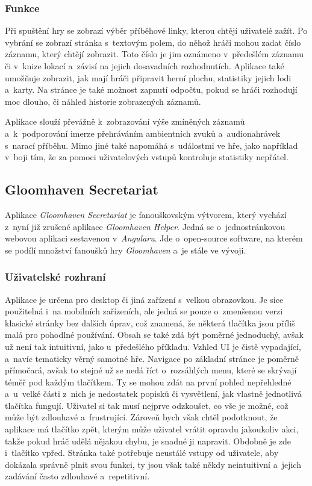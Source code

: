 \subsubsection*{Funkce}
Při spuštění hry se zobrazí výběr příběhové linky, kterou chtějí uživatelé zažít. Po vybrání se zobrazí stránka s~textovým polem, do něhož hráči mohou zadat číslo záznamu, který chtějí zobrazit. Toto číslo je jim oznámeno v~předešlém záznamu či v~knize lokací a~závisí na jejich dosavadních rozhodnutích. Aplikace také umožňuje zobrazit, jak mají hráči připravit herní plochu, statistiky jejich lodi a~karty. Na stránce je také možnost zapnutí odpočtu, pokud se hráči rozhodují moc dlouho, či náhled historie zobrazených záznamů.

Aplikace slouží převážně k~zobrazování výše zmíněných záznamů a~k~podporování imerze přehráváním ambientních zvuků a~audionahrávek s~narací příběhu. Mimo jiné také napomáhá s~událostmi ve hře, jako například v~boji tím, že za pomoci uživatelových vstupů kontroluje statistiky nepřátel.
 
\pagebreak
\subsection{Gloomhaven Secretariat}
Aplikace \textit{Gloomhaven Secretariat} je fanouškovským výtvorem, který vychází z~nyní již zrušené aplikace \textit{Gloomhaven Helper}. Jedná se o~jednostránkovou webovou aplikaci sestavenou v~\textit{Angularu}. Jde o~open-source software, na kterém se podílí množství fanoušků hry \textit{Gloomhaven} a~je stále ve vývoji. \cite{gloomhaven_secretariat_github}

\subsubsection*{Uživatelské rozhraní}
Aplikace je určena pro desktop či jiná zařízení s~velkou obrazovkou. Je sice použitelná i~na mobilních zařízeních, ale jedná se pouze o~zmenšenou verzi klasické stránky bez dalších úprav, což znamená, že některá tlačítka jsou příliš malá pro pohodlné používání. Obsah se také zdá být poměrné jednoduchý, avšak už není tak intuitivní, jako u~předešlého příkladu. Vzhled UI je čistě vypadající, a~navíc tematicky věrný samotné hře. Navigace po základní stránce je poměrně přímočará, avšak to stejné už se nedá říct o~rozsáhlých menu, které se skrývají téměř pod každým tlačítkem. Ty se mohou zdát na první pohled nepřehledné a~u~velké části z~nich je nedostatek popisků či vysvětlení, jak vlastně jednotlivá tlačítka fungují. Uživatel si tak musí nejprve odzkoušet, co vše je možné, což může být zdlouhavé a~frustrující. Zároveň bych však chtěl podotknout, že aplikace má tlačítko zpět, kterým může uživatel vrátit opravdu jakoukoliv akci, takže pokud hráč udělá nějakou chybu, je snadné ji napravit. Obdobně je zde i~tlačítko vpřed. Stránka také potřebuje neustálé vstupy od uživatele, aby dokázala správně plnit svou funkci, ty jsou však také někdy neintuitivní a~jejich zadávání často zdlouhavé a~repetitivní.

